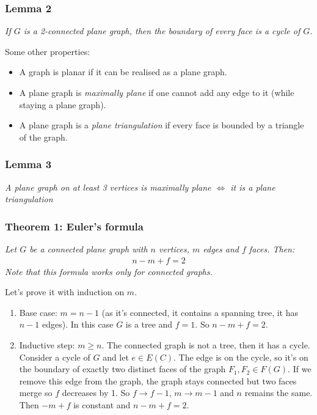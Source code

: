 		
		\subsubsection{Lemma 2}
		\textit{If $G$ is a 2-connected plane graph, then the boundary of every face is a cycle of $G$.\\}
		
		Some other properties:
		\begin{itemize}
			\item A graph is planar if it can be realised as a plane graph.
			\item A plane graph is \textit{maximally plane} if one cannot add any edge to it (while staying a plane graph).
			\item A plane graph is a \textit{plane triangulation} if every face is bounded by a triangle of the graph.
		\end{itemize}
		
		
		\subsubsection{Lemma 3}
		\textit{A plane graph on at least 3 vertices is maximally plane $\iff$ it is a plane triangulation}
		
		
		\subsubsection{Theorem 1: Euler's formula}
		\textit{Let $G$ be a connected plane graph with $n$ vertices, $m$ edges and $f$ faces. Then:}
		\begin{eqnarray}
			n - m + f = 2
		\end{eqnarray}
		\textit{Note that this formula works only for connected graphs.\\}
		
		Let's prove it with induction on $m$.
		\begin{enumerate}
			\item Base case: $m = n -1$ (as it's connected, it contains a spanning tree, it has $n - 1$ edges). In this case $G$ is a tree and $f = 1$. So $n - m + f = 2$.
			\item Inductive step: $m \geq n$. The connected graph is not a tree, then it has a cycle. Consider a cycle of $G$ and let $e \in E(C)$. The edge is on the cycle, so it's on the boundary of exactly two distinct faces of the graph $F_1, F_2 \in F(G)$. If we remove this edge from the graph, the graph stays connected but two faces merge so $f$ decreases by 1. So $f \rightarrow f -1$, $m \rightarrow m - 1$ and $n$ remains the same. Then $-m + f$ is constant and $n -m + f = 2$.
		\end{enumerate}
		
